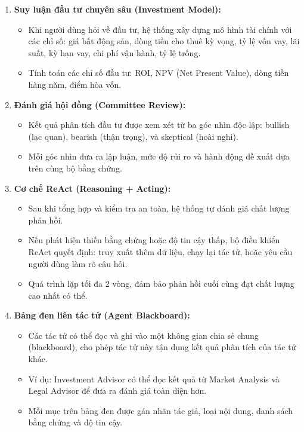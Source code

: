 \begin{enumerate}
    \item \textbf{Suy luận đầu tư chuyên sâu (Investment Model):}
    \begin{itemize}
        \item Khi người dùng hỏi về đầu tư, hệ thống xây dựng mô hình tài chính với các chỉ số: giá bất động sản, dòng tiền cho thuê kỳ vọng, tỷ lệ vốn vay, lãi suất, kỳ hạn vay, chi phí vận hành, tỷ lệ trống.
        \item Tính toán các chỉ số đầu tư: ROI, NPV (Net Present Value), dòng tiền hàng năm, điểm hòa vốn.
    \end{itemize}

    \item \textbf{Đánh giá hội đồng (Committee Review):}
    \begin{itemize}
        \item Kết quả phân tích đầu tư được xem xét từ ba góc nhìn độc lập: bullish (lạc quan), bearish (thận trọng), và skeptical (hoài nghi).
        \item Mỗi góc nhìn đưa ra lập luận, mức độ rủi ro và hành động đề xuất dựa trên cùng bộ bằng chứng.
    \end{itemize}

    \item \textbf{Cơ chế ReAct (Reasoning + Acting):}
    \begin{itemize}
        \item Sau khi tổng hợp và kiểm tra an toàn, hệ thống tự đánh giá chất lượng phản hồi.
        \item Nếu phát hiện thiếu bằng chứng hoặc độ tin cậy thấp, bộ điều khiển ReAct quyết định: truy xuất thêm dữ liệu, chạy lại tác tử, hoặc yêu cầu người dùng làm rõ câu hỏi.
        \item Quá trình lặp tối đa 2 vòng, đảm bảo phản hồi cuối cùng đạt chất lượng cao nhất có thể.
    \end{itemize}

    \item \textbf{Bảng đen liên tác tử (Agent Blackboard):}
    \begin{itemize}
        \item Các tác tử có thể đọc và ghi vào một không gian chia sẻ chung (blackboard), cho phép tác tử này tận dụng kết quả phân tích của tác tử khác.
        \item Ví dụ: Investment Advisor có thể đọc kết quả từ Market Analysis và Legal Advisor để đưa ra đánh giá toàn diện hơn.
        \item Mỗi mục trên bảng đen được gán nhãn tác giả, loại nội dung, danh sách bằng chứng và độ tin cậy.
    \end{itemize}


\end{enumerate}
